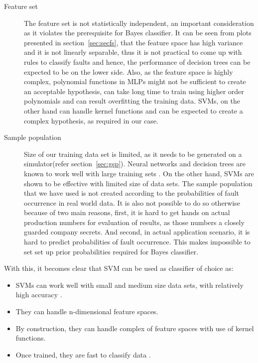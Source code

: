 \begin{description}
  \item[Feature set] The feature set is not statistically independent, an important consideration as it violates the prerequisite for Bayes classifier. It can be seen from plots presented in section~\ref{sec:secfs}, that the feature space has high variance and it is not linearly separable, thus it is not practical to come up with rules to classify faults and hence, the performance of decision trees can be expected to be on the lower side. Also, as the feature space is highly complex, polynomial functions in MLPs might not be sufficient to create an acceptable hypothesis, can take long time to train using higher order polynomials and can result overfitting the training data. SVMs, on the other hand can handle kernel functions and can be expected to create a complex hypothesis, as required in our case.

  \item[Sample population] Size of our training data set is limited, as it needs to be generated on a simulator(refer section~\ref{sec:gsp}). Neural networks and decision trees are known to work well with large training sets \cite{DeFries2000,Tanwani2009}. On the other hand, SVMs are shown to be effective with limited size of data sets\cite{Koggalage2004}. The sample population that we have used is not created according to the probabilities of fault occurrence in real world data. It is also not possible to do so otherwise because of two main reasons, first, it is hard to get hands on actual production numbers for evaluation of results, as those numbers a closely guarded company secrets. And second, in actual application scenario, it is hard to predict probabilities of fault occurrence. This makes impossible to set set up prior probabilities required for Bayes classifier.
\end{description}

With this, it becomes clear that SVM can be used as classifier of choice as:
\begin{itemize}
  \item SVMs can work well with small and medium size data sets, with relatively high accuracy \cite{Koggalage2004, Matlab2014}.
  \item They can handle n-dimensional feature spaces.
  \item By construction, they can handle complex of feature spaces with use of kernel functions.
  \item Once trained, they are fast to classify data .
\end{itemize}
